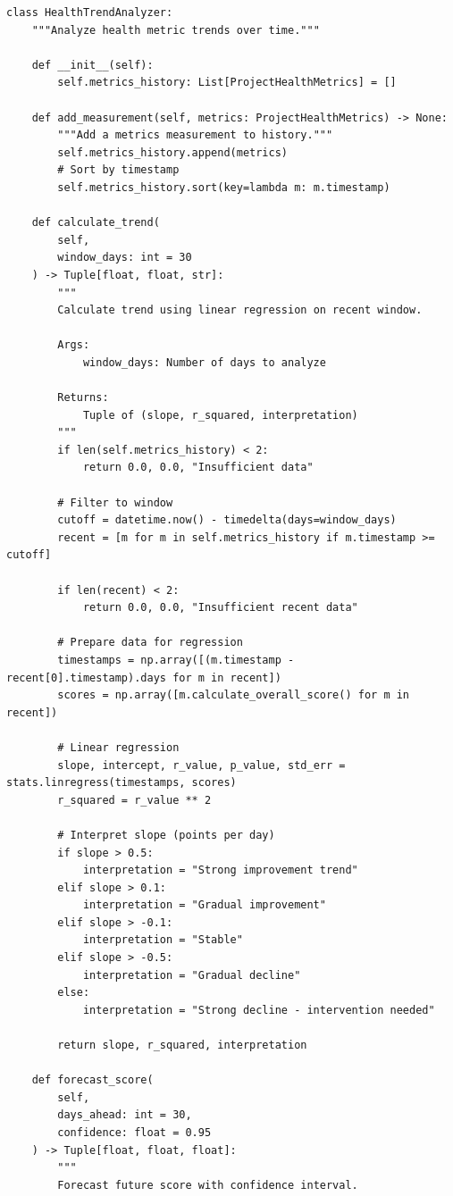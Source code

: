 \begin{lstlisting}[style=python, caption={Comprehensive project health metrics framework with 15+ dimensions}]
class HealthTrendAnalyzer:
    """Analyze health metric trends over time."""

    def __init__(self):
        self.metrics_history: List[ProjectHealthMetrics] = []

    def add_measurement(self, metrics: ProjectHealthMetrics) -> None:
        """Add a metrics measurement to history."""
        self.metrics_history.append(metrics)
        # Sort by timestamp
        self.metrics_history.sort(key=lambda m: m.timestamp)

    def calculate_trend(
        self,
        window_days: int = 30
    ) -> Tuple[float, float, str]:
        """
        Calculate trend using linear regression on recent window.

        Args:
            window_days: Number of days to analyze

        Returns:
            Tuple of (slope, r_squared, interpretation)
        """
        if len(self.metrics_history) < 2:
            return 0.0, 0.0, "Insufficient data"

        # Filter to window
        cutoff = datetime.now() - timedelta(days=window_days)
        recent = [m for m in self.metrics_history if m.timestamp >= cutoff]

        if len(recent) < 2:
            return 0.0, 0.0, "Insufficient recent data"

        # Prepare data for regression
        timestamps = np.array([(m.timestamp - recent[0].timestamp).days for m in recent])
        scores = np.array([m.calculate_overall_score() for m in recent])

        # Linear regression
        slope, intercept, r_value, p_value, std_err = stats.linregress(timestamps, scores)
        r_squared = r_value ** 2

        # Interpret slope (points per day)
        if slope > 0.5:
            interpretation = "Strong improvement trend"
        elif slope > 0.1:
            interpretation = "Gradual improvement"
        elif slope > -0.1:
            interpretation = "Stable"
        elif slope > -0.5:
            interpretation = "Gradual decline"
        else:
            interpretation = "Strong decline - intervention needed"

        return slope, r_squared, interpretation

    def forecast_score(
        self,
        days_ahead: int = 30,
        confidence: float = 0.95
    ) -> Tuple[float, float, float]:
        """
        Forecast future score with confidence interval.


\end{lstlisting}
